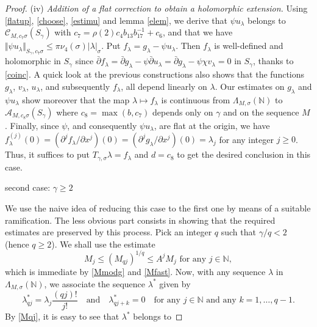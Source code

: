 \documentclass[a4paper]{amsart}
\theoremstyle{plain}
\theoremstyle{definition}
\theoremstyle{remark}
\begin{document}
\begin{proof}
\noindent (iv) \textit{Addition of a flat correction to obtain a holomorphic extension.}
Using \eqref{flatup}, \eqref{choose}, \eqref{estimu} and lemma \ref{elem}, we derive 
that $ \psi u_\lambda $ belongs to $ \mathcal{C}_{M,c_7\sigma}(S_\gamma) $ with $ c_7=\rho(2)c_4b_{13}b_{17}^{-1}+c_6 $, and that we have
$ \Vert \psi u_\lambda\Vert_{S_\gamma,c_7\sigma}\leq 
\pi\nu_4(\sigma)
\vert \lambda\vert_\sigma $.
Put $ f_\lambda= g_\lambda-\psi u_\lambda. $ Then $ f_\lambda $ is
well-defined and holomorphic in $ S_\gamma $ since $ \bar\partial f_\lambda=
\bar\partial g_\lambda-\psi\bar\partial u_\lambda=
\bar\partial g_\lambda-\psi\chi v_\lambda=0 $ in $ S_\gamma $, thanks to \eqref{coinc}.
A quick look at the previous constructions also shows that the functions  $ g_\lambda $, $ v_\lambda $, $ u_\lambda $, and subsequently $ f_\lambda $, all depend linearly on $ \lambda $. Our estimates on $ g_\lambda $ and $ \psi u_\lambda $ show moreover that the
map $ \lambda\longmapsto f_\lambda $ is continuous from 
$ \Lambda_{M,\sigma}(\mathbb{N}) $ to
$ \mathcal{A}_{M,c_8\sigma}(S_\gamma) $ where $ c_8=\max(b,c_7) $ depends only on
$ \gamma $ and on the sequence $ M $.
Finally, since $ \psi $, and consequently $ \psi u_\lambda $, are flat at the origin, we have $ f_\lambda^{(j)}(0)=(\partial^j f_\lambda/\partial x^j)(0)=
(\partial^j g_\lambda/\partial x^j)(0)=\lambda_j $ for any integer $ j\geq 0 $. Thus, it suffices to put $ T_{\gamma,\sigma}\lambda=f_\lambda $ and $ d=c_8 $ to get the desired conclusion in this case. 
\begin{center}
\textsf{second case}: $ \gamma\geq 2 $
\end{center}
We use the naive idea of reducing this case to the first one by means of a suitable ramification. The less obvious part consists in showing that the required estimates are preserved by this process. Pick an integer $ q $ such that $ \gamma/q <2 $ (hence $ q\geq 2 $). We shall use the estimate
\begin{equation}\label{Mqj}
M_j\leq (M_{qj})^{1/q}\leq A^jM_j\text{ for any }j\in\mathbb{N},
\end{equation}
which is immediate by \eqref{Mmodg} and \eqref{Mfast}. Now, with any sequence
$ \lambda $ in
$ \Lambda_{M,\sigma}(\mathbb{N}) $, we associate the sequence $ \lambda^* $ given by
\begin{equation*}
\lambda^*_{qj}=\lambda_j\frac{(qj)!}{j!}\quad\text{and}\quad\lambda^*_{qj+k}=0
\quad\text{for any }j\in\mathbb{N}\text{ and any }k=1,\ldots,q-1.
\end{equation*}
By \eqref{Mqj}, it is easy to see that $ \lambda^* $ belongs to 

\end{proof}
\end{document}
